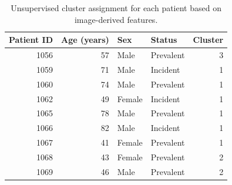 \begin{table}[htbp]
    \centering
    \caption{Unsupervised cluster assignment for each patient based on image-derived features.}
    \label{tab:patient_clusters}
\begin{tabular}{rrllr}
\toprule
Patient ID & Age (years) & Sex & Status & Cluster \\
\midrule
1056 & 57 & Male & Prevalent & 3 \\
1059 & 71 & Male & Incident & 1 \\
1060 & 74 & Male & Prevalent & 1 \\
1062 & 49 & Female & Incident & 1 \\
1065 & 78 & Male & Prevalent & 1 \\
1066 & 82 & Male & Incident & 1 \\
1067 & 41 & Female & Prevalent & 1 \\
1068 & 43 & Female & Prevalent & 2 \\
1069 & 46 & Male & Prevalent & 2 \\
\bottomrule
\end{tabular}

\end{table}
